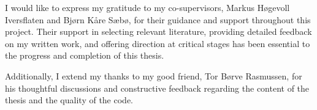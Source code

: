 I would like to express my gratitude to my co-supervisors, Markus Høgevoll
Iversflaten and Bjørn Kåre Sæbø, for their guidance and support throughout this
project. Their support in selecting relevant literature, providing detailed
feedback on my written work, and offering direction at critical stages has been
essential to the progress and completion of this thesis.

Additionally, I extend my thanks to my good friend, Tor Børve Rasmussen,
for his thoughtful discussions and constructive feedback regarding the content
of the thesis and the quality of the code.

